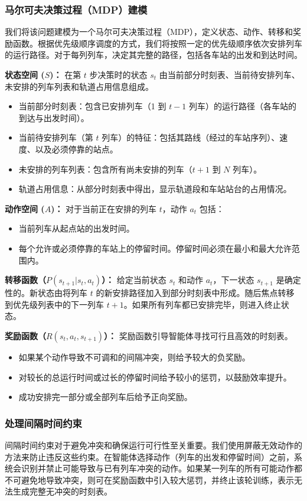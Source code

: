 \documentclass{article}
\begin{document}
\subsubsection{马尔可夫决策过程（MDP）建模}
我们将该问题建模为一个马尔可夫决策过程（MDP），定义状态、动作、转移和奖励函数。根据优先级顺序调度的方式，我们将按照一定的优先级顺序依次安排列车的运行路径。对于每列列车，决定其完整的路径，包括各车站的出发和到达时间。

\textbf{状态空间 ($S$)：}
在第 $t$ 步决策时的状态 $s_t$ 由当前部分时刻表、当前待安排列车、未安排的列车列表和轨道占用信息组成。
\begin{itemize}
    \item 当前部分时刻表：包含已安排列车（1 到 $t-1$ 列车）的运行路径（各车站的到达与出发时间）。
    \item 当前待安排列车（第 $t$ 列车）的特征：包括其路线（经过的车站序列）、速度、以及必须停靠的站点。
    \item 未安排的列车列表：包含所有尚未安排的列车（$t+1$ 到 $N$ 列车）。
    \item 轨道占用信息：从部分时刻表中得出，显示轨道段和车站站台的占用情况。
\end{itemize}

\textbf{动作空间 ($A$)：}
对于当前正在安排的列车 $t$，动作 $a_t$ 包括：
\begin{itemize}
    \item 当前列车从起点站的出发时间。
    \item 每个允许或必须停靠的车站上的停留时间。停留时间必须在最小和最大允许范围内。
\end{itemize}

\textbf{转移函数（$P(s_{t+1} | s_t, a_t)$）：}
给定当前状态 $s_t$ 和动作 $a_t$，下一状态 $s_{t+1}$ 是确定性的。新状态由将列车 $t$
的新安排路径加入到部分时刻表中形成。随后焦点转移到优先级列表中的下一列车 $t+1$。如果所有列车都已安排完毕，则进入终止状态。

\textbf{奖励函数（$R(s_t, a_t, s_{t+1})$）：}
奖励函数引导智能体寻找可行且高效的时刻表。
\begin{itemize}
    \item 如果某个动作导致不可调和的间隔冲突，则给予较大的负奖励。
    \item 对较长的总运行时间或过长的停留时间给予较小的惩罚，以鼓励效率提升。
    \item 成功安排完一部分或全部列车后给予正向奖励。
\end{itemize}

\subsubsection{处理间隔时间约束}
间隔时间约束对于避免冲突和确保运行可行性至关重要。我们使用屏蔽无效动作的方法来防止违反这些约束。在智能体选择动作（列车的出发和停留时间）之前，系统会识别并禁止可能导致与已有列车冲突的动作。如果某一列车的所有可能动作都不可避免地导致冲突，则可在奖励函数中引入较大惩罚，并终止该轮训练，表示无法生成完整无冲突的时刻表。
\end{document}
